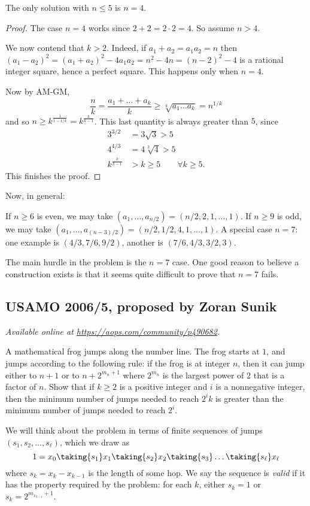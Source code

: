 \documentclass[11pt]{scrartcl}
\begin{document}
\begin{claim*}
  The only solution with $n \le 5$ is $n = 4$.
\end{claim*}
\begin{proof}
  The case $n=4$ works since $2+2 = 2\cdot2=4$.
  So assume $n > 4$.

  We now contend that $k > 2$.
  Indeed, if $a_1 + a_2 = a_1 a_2 = n$ then
  $(a_1-a_2)^2 = (a_1+a_2)^2 - 4a_1a_2 = n^2-4n = (n-2)^2 - 4$
  is a rational integer square, hence a perfect square.
  This happens only when $n = 4$.

  Now by AM-GM,
  \[ \frac nk = \frac{a_1 + \dots + a_k}{k}
    \ge \sqrt[k]{a_1 \dots a_k} = n^{1/k} \]
  and so $n \ge k^{\frac{1}{1 - 1/k}} = k^{\frac{k}{k-1}}$.
  This last quantity is always greater than $5$, since
  \begin{align*}
    3^{3/2} &= 3\sqrt3 > 5 \\
    4^{4/3} &= 4\sqrt[3]{4} > 5 \\
    k^{\frac{k}{k-1}} &> k \ge 5 \qquad \forall k \ge 5.
  \end{align*}
  This finishes the proof.
\end{proof}

Now, in general:
\begin{itemize}
  \ii If $n \ge 6$ is even, we may take
  $(a_1, \dots, a_{n/2}) = (n/2, 2, 1, \dots, 1)$.
  \ii If $n \ge 9$ is odd, we may take
  $(a_1, \dots, a_{(n-3)/2}) = (n/2, 1/2, 4, 1, \dots, 1)$.
  \ii A special case $n = 7$:
  one example is $(4/3, 7/6, 9/2)$,
  another is $(7/6, 4/3, 3/2, 3)$.
\end{itemize}

\begin{remark*}
  The main hurdle in the problem is the $n=7$ case.
  One good reason to believe a construction exists is that
  it seems quite difficult to prove that $n=7$ fails.
\end{remark*}
\pagebreak

\subsection{USAMO 2006/5, proposed by Zoran Sunik}
\textsl{Available online at \url{https://aops.com/community/p490682}.}
\begin{mdframed}[style=mdpurplebox,frametitle={Problem statement}]
A mathematical frog jumps along the number line.
The frog starts at $1$, and jumps according to the following rule:
if the frog is at integer $n$,
then it can jump either to $n+1$ or to $n + 2^{m_n+1}$
where $2^{m_n}$ is the largest power of $2$ that is a factor of $n$.
Show that if $k \ge 2$ is a positive integer
and $i$ is a nonnegative integer,
then the minimum number of jumps needed to reach $2^ik$
is greater than the minimum number of jumps needed to reach $2^i$.
\end{mdframed}
We will think about the problem in terms of
finite sequences of jumps $(s_1, s_2, \dots, s_\ell)$,
which we draw as
\[ 1 = x_0
  \taking{s_1} x_1
  \taking{s_2} x_2
  \taking{s_3} \dots
  \taking{s_\ell} x_\ell \]
where $s_k = x_k - x_{k-1}$ is the length of some hop.
We say the sequence is \emph{valid} if it has the
property required by the problem:
for each $k$, either $s_k = 1$ or $s_k = 2^{m_{x_{k-1}}+1}$.
\end{document}
